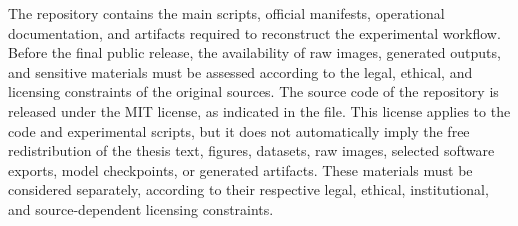 The repository contains the main scripts, official manifests, operational
documentation, and artifacts required to reconstruct the experimental workflow.
Before the final public release, the availability of raw images, generated
outputs, and sensitive materials must be assessed according to the legal,
ethical, and licensing constraints of the original sources. The source code of
the repository is released under the MIT license, as indicated in the
 file. This license applies to the code and experimental
scripts, but it does not automatically imply the free redistribution of the
thesis text, figures, datasets, raw images, selected software exports, model
checkpoints, or generated artifacts. These materials must be considered
separately, according to their respective legal, ethical, institutional, and
source-dependent licensing constraints.
